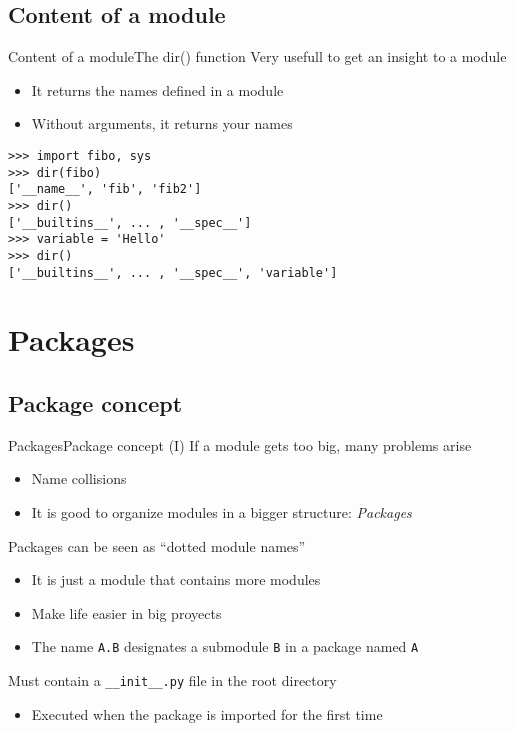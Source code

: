 \documentclass[10pt,compress]{beamer} %
\begin{document}
\subsection{Content of a module}

\begin{frame}[fragile]{Content of a module}{The dir() function}
	Very usefull to get an insight to a module
	\begin{itemize}
		\item It returns the names defined in a module
		\item Without arguments, it returns your names
	\end{itemize}
	\begin{exampleblock}{}
	\begin{verbatim}
>>> import fibo, sys
>>> dir(fibo)
['__name__', 'fib', 'fib2']
>>> dir()
['__builtins__', ... , '__spec__']
>>> variable = 'Hello'
>>> dir()
['__builtins__', ... , '__spec__', 'variable']
\end{verbatim}
	\vspace{-0.2cm}
	\end{exampleblock}
\end{frame}

\section{Packages}
\subsection{Package concept}
\begin{frame}{Packages}{Package concept (I)}
		If a module gets too big, many problems arise
			\begin{itemize}
			\item Name collisions
			\item It is good to organize modules in a bigger structure: \textit{Packages}
			\end{itemize}
		Packages can be seen as ``dotted module names''
			\begin{itemize}
			\item It is just a module that contains more modules
			\item Make life easier in big proyects
			\item The name \texttt{A.B} designates a submodule \texttt{B} in a package named \texttt{A}
			\end{itemize}
		Must contain a \texttt{\_\_init\_\_.py} file in the root directory
			\begin{itemize}
			\item Executed when the package is imported for the first time
			\end{itemize}
\end{frame}
\end{document}
